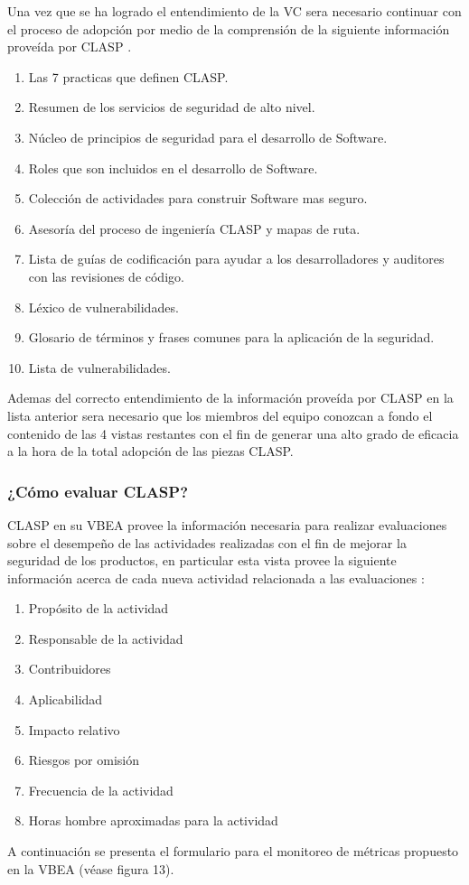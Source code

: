 \documentclass[runningheads,a4paper]{llncs}
\begin{document}
Una vez que se ha logrado el entendimiento de la \gls{VC} sera necesario continuar con el proceso de adopción  por medio de la comprensión de la siguiente información proveída por \gls{CLASP} \cite{CLASPIntroduction}.
\\
\begin{enumerate}
	\item Las 7 practicas que definen \gls{CLASP}.
	\item Resumen de los servicios de seguridad de alto nivel.
	\item Núcleo de principios de seguridad para el desarrollo de \gls{Software}.
	\item Roles que son incluidos en el desarrollo de \gls{Software}.
	\item Colección de actividades para construir \gls{Software} mas seguro.
	\item Asesoría del proceso de ingeniería \gls{CLASP} y mapas de ruta. 
	\item Lista de guías de codificación para ayudar a los desarrolladores y auditores con las revisiones de código.
	\item Léxico de vulnerabilidades.
	\item Glosario de términos y frases comunes para la aplicación de la seguridad.
	\item Lista de vulnerabilidades.\\
	
\end{enumerate}
Ademas del correcto entendimiento de la información proveída por \gls{CLASP} en la lista anterior sera necesario que los miembros del equipo conozcan a fondo el contenido de las 4 vistas restantes con el fin de generar una alto grado de eficacia a la hora de la total adopción de las piezas \gls{CLASP}. 

\subsubsection{¿Cómo evaluar \gls{CLASP}?}
\gls{CLASP} en su \gls{VBEA} provee la información necesaria para realizar evaluaciones sobre el desempeño de las actividades realizadas con el fin de mejorar la seguridad de los productos, en particular esta vista provee la siguiente información acerca de cada nueva actividad relacionada a las evaluaciones \cite{AAViewCLAPS}:

\begin{enumerate}
	\item Propósito de la actividad
	\item Responsable de la actividad
	\item Contribuidores
	\item Aplicabilidad
	\item Impacto relativo
	\item Riesgos por omisión
	\item Frecuencia de la actividad
	\item Horas hombre aproximadas para la actividad
	
\end{enumerate}
A continuación se presenta el formulario para el monitoreo de métricas propuesto en la \gls{VBEA} (véase figura 13).
\\
\end{document}
